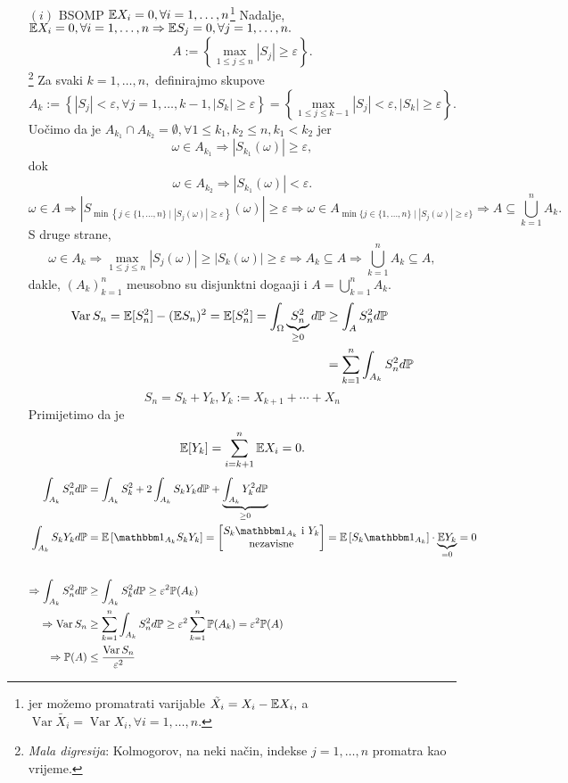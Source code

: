 \documentclass{article}
\newcommand{\Var}{\operatorname{Var}}
\begin{document}
\begin{enumerate}
    \item[\((i)\)] BSOMP \(\Bbb EX_i=0,\forall i=1,\ldots,n\)\footnote[16]{jer možemo promatrati varijable \(\tilde{X_i}=X_i-\Bbb EX_i,\) a \(\Var \tilde{X_i}=\Var X_i,\forall i=1,\ldots,n.\)} Nadalje, \(\Bbb EX_i=0,\forall i=1,\ldots,n\Rightarrow \Bbb ES_j=0,\forall j=1,\ldots,n.\) \[A:=\left\{\max_{1\le j\le n}|S_j|\ge\varepsilon\right\}.\]  \footnote[17]{\textit{Mala digresija}: Kolmogorov, na neki način, indekse \(j=1,\ldots, n\) promatra kao vrijeme.} Za svaki \(k=1,\ldots,n,\) definirajmo skupove \[A_k:=\left\{|S_j|<\varepsilon,\forall j=1,\ldots,k-1,|S_k|\ge\varepsilon\right\}=\left\{\max_{1\le j\le k-1}|S_j|<\varepsilon, |S_k|\ge\varepsilon\right\}.\] Uočimo da je \(A_{k_1}\cap A_{k_2}=\emptyset,\forall 1\le k_1,k_2\le n,k_1< k_2\) jer \[\omega\in A_{k_1}\Rightarrow |S_{k_1}(\omega)|\ge\varepsilon,\] dok \[\omega\in A_{k_2}\Rightarrow |S_{k_1}(\omega)|<\varepsilon.\] \[\omega\in A\Rightarrow \left|S_{\min\left\{j\in\{1,\ldots,n\}\mid|S_j(\omega)|\ge\varepsilon\right\}}(\omega)\right|\ge\varepsilon\Rightarrow\omega\in A_{\min\{j\in\{1,\ldots,n\}\mid |S_j(\omega)|\ge\varepsilon\}}\Rightarrow A\subseteq\bigcup_{k=1}^nA_k.\] S druge strane, \[\omega\in A_k\Rightarrow\max_{1\le j\le n}|S_j(\omega)|\ge |S_k(\omega)|\ge\varepsilon\Rightarrow A_k\subseteq A\Rightarrow\bigcup_{k=1}^nA_k\subseteq A,\] dakle, \((A_k)_{k=1}^n\) me\dj{}usobno su disjunktni doga\dj{}aji i \(A=\displaystyle\bigcup_{k=1}^nA_k.\) \[\begin{aligned}\Var S_n=\Bbb E[S_n^2]-(\Bbb ES_n)^2=\Bbb E[S_n^2]=\int_\Omega \underbrace{S_n^2}_{\ge 0}d\Bbb P&\ge\int_AS_n^2d\Bbb P\\&=\sum_{k=1}^n\int_{A_k}S_n^2d\Bbb P\end{aligned}\] \[S_n=S_k+Y_k,Y_k:=X_{k+1}+\cdots+X_n\] Primijetimo da je \[\Bbb E[Y_k]=\sum_{i=k+1}^n\Bbb EX_i=0.\] \[\begin{aligned}\int_{A_k}S_n^2d\Bbb P&=\int_{A_k}S_k^2+2\int_{A_k}S_kY_kd\Bbb P+\underbrace{\int_{A_k}Y_k^2d\Bbb P}_{\ge 0}\\\int_{A_k}S_kY_kd\Bbb P&=\Bbb E\left[\mathbbm 1_{A_k}S_kY_k\right]=\begin{bmatrix}S_k\mathbbm 1_{A_k}\text{ i } Y_k\\\text{nezavisne}\end{bmatrix}=\Bbb E\left[S_k\mathbbm 1_{A_k}\right]\cdot\underbrace{\Bbb EY_k}_{=0}=0\\\\\Rightarrow\int_{A_k}S_n^2d\Bbb P&\ge\int_{A_k}S_k^2d\Bbb P\ge\varepsilon^2\Bbb P(A_k)\\\Rightarrow\Var S_n&\ge\sum_{k=1}^n\int_{A_k}S_n^2d\Bbb P\ge\varepsilon^2\sum_{k=1}^n\Bbb P(A_k)=\varepsilon^2\Bbb P(A)\\\Rightarrow\Bbb P(A)&\le\frac{\Var S_n}{\varepsilon^2}\end{aligned}\]

\end{enumerate}
\end{document}
